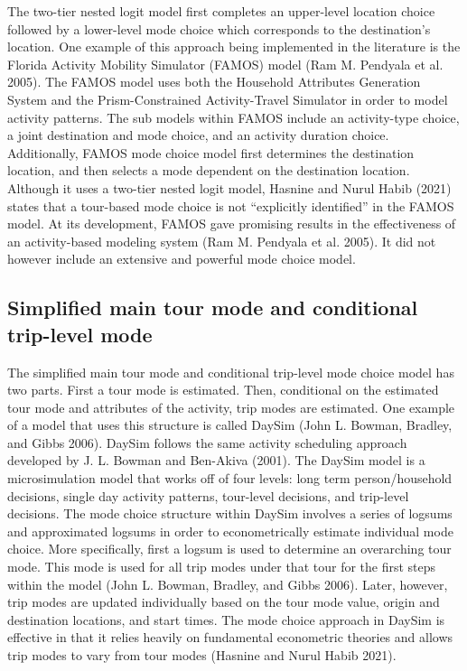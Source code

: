 \documentclass[12pt, oneside, openright]{byuthesis}
\begin{document}
The two-tier nested logit model first completes an upper-level location choice followed by a lower-level mode choice which corresponds to the destination's location. One example of this approach being implemented in the literature is the Florida Activity Mobility Simulator (FAMOS) model (Ram M. Pendyala et al. 2005). The FAMOS model uses both the Household Attributes Generation System and the Prism-Constrained Activity-Travel Simulator in order to model activity patterns. The sub models within FAMOS include an activity-type choice, a joint destination and mode choice, and an activity duration choice. Additionally, FAMOS mode choice model first determines the destination location, and then selects a mode dependent on the destination location. Although it uses a two-tier nested logit model, Hasnine and Nurul Habib (2021) states that a tour-based mode choice is not ``explicitly identified'' in the FAMOS model. At its development, FAMOS gave promising results in the effectiveness of an activity-based modeling system (Ram M. Pendyala et al. 2005). It did not however include an extensive and powerful mode choice model.

\hypertarget{lit33}{%
\subsection{Simplified main tour mode and conditional trip-level mode}\label{lit33}}

The simplified main tour mode and conditional trip-level mode choice model has two parts. First a tour mode is estimated. Then, conditional on the estimated tour mode and attributes of the activity, trip modes are estimated. One example of a model that uses this structure is called DaySim (John L. Bowman, Bradley, and Gibbs 2006). DaySim follows the same activity scheduling approach developed by J. L. Bowman and Ben-Akiva (2001). The DaySim model is a microsimulation model that works off of four levels: long term person/household decisions, single day activity patterns, tour-level decisions, and trip-level decisions. The mode choice structure within DaySim involves a series of logsums and approximated logsums in order to econometrically estimate individual mode choice. More specifically, first a logsum is used to determine an overarching tour mode. This mode is used for all trip modes under that tour for the first steps within the model (John L. Bowman, Bradley, and Gibbs 2006). Later, however, trip modes are updated individually based on the tour mode value, origin and destination locations, and start times. The mode choice approach in DaySim is effective in that it relies heavily on fundamental econometric theories and allows trip modes to vary from tour modes (Hasnine and Nurul Habib 2021).
\end{document}
